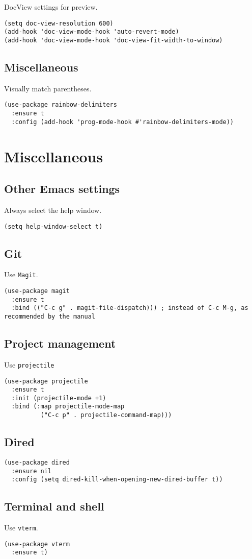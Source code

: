 \documentclass[a4paper,11pt]{article}
\begin{document}
DocView settings for preview.
\begin{verbatim}
(setq doc-view-resolution 600)
(add-hook 'doc-view-mode-hook 'auto-revert-mode)
(add-hook 'doc-view-mode-hook 'doc-view-fit-width-to-window)
\end{verbatim}

\subsection{Miscellaneous}
\label{sec:orge481ad3}
Visually match parentheses.
\begin{verbatim}
(use-package rainbow-delimiters
  :ensure t
  :config (add-hook 'prog-mode-hook #'rainbow-delimiters-mode))
\end{verbatim}

\section{Miscellaneous}
\label{sec:orgfc5cc44}
\subsection{Other Emacs settings}
\label{sec:org894793b}
Always select the help window.
\begin{verbatim}
(setq help-window-select t)
\end{verbatim}

\subsection{Git}
\label{sec:orgf599dc0}
Use \texttt{Magit}.
\begin{verbatim}
(use-package magit
  :ensure t
  :bind (("C-c g" . magit-file-dispatch))) ; instead of C-c M-g, as recommended by the manual
\end{verbatim}

\subsection{Project management}
\label{sec:org321d8c3}
Use \texttt{projectile}
\begin{verbatim}
(use-package projectile
  :ensure t
  :init (projectile-mode +1)
  :bind (:map projectile-mode-map
	      ("C-c p" . projectile-command-map)))
\end{verbatim}

\subsection{Dired}
\label{sec:orga468f2a}
\begin{verbatim}
(use-package dired
  :ensure nil
  :config (setq dired-kill-when-opening-new-dired-buffer t))
\end{verbatim}

\subsection{Terminal and shell}
\label{sec:orgb5a81bf}
Use \texttt{vterm}.
\begin{verbatim}
(use-package vterm
  :ensure t)
\end{verbatim}
\end{document}
